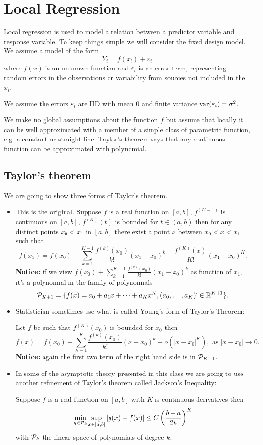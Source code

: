 
\chapter{Local Regression}
Local regression is used to model a relation between a predictor
variable and response variable. To keep things simple we will consider
the fixed design model. We assume a model of the form
\[
Y_i = f(x_i) + \varepsilon_i
\]
where $f(x)$ is an unknown function and $\varepsilon_i$ is an error term,
representing random errors in the observations or variability from
sources not included in the $x_i$.

We assume the errors $\varepsilon_i$ are IID with mean 0 and finite
variance $\mbox{var}(\varepsilon_i) = \sigma^2$. 

We make no global assumptions about the function $f$ but assume that
locally it can be well approximated with a member of a simple class of
parametric function, e.g. a constant or straight line. Taylor's
theorem says that any continuous function can be approximated with
polynomial. 
 
\section{Taylor's theorem}
We are going to show three forms of Taylor's theorem. 
\begin{itemize}

\item This is the original. Suppose $f$ is a real function on $[a,b]$, $f^{(K-1)}$ is continuous on
$[a,b]$,  $f^{(K)}(t)$ is bounded for $t \in (a,b)$ then
for any distinct points $x_0 < x_1$ in $[a,b]$ there exist a point
$x$ between $x_0 < x < x_1$ such that 
\[
f(x_1) = f(x_0) + \sum_{k=1}^{K-1} \frac{f^{(k)}(x_0)}{k!}(x_1-x_0)^k +
\frac{f^{(K)}(x)}{K!}(x_1 - x_0)^K.
\]
{\bf Notice:} if we view $f(x_0) + \sum_{k=1}^{K-1}
\frac{f^{(k)}(x_0)}{k!}(x_1-x_0)^k$ as function of $x_1$, it's a
polynomial in the family of polynomials  
\[
{\cal  P}_{K+1}= \{f(x) = a_0 + a_1 x + \dots + a_K x^K,
(a_0,\dots,a_K)' \in {\mathbb R}^{K+1}\}.
\]

\item Statistician sometimes use what is called Young's form of Taylor's
Theorem:

Let $f$ be such that $f^{(K)}(x_0)$ is bounded for $x_0$ then
\[
f(x) = f(x_0) +  \sum_{k=1}^{K} \frac{f^{(k)}(x_0)}{k!}(x-x_0)^k +
o(|x-x_0|^K), \mbox{ as } |x-x_0| \rightarrow 0.
\]
{\bf Notice:} again the first two term of the right hand side is in ${\cal P}_{K+1}$.


\item In some of the asymptotic theory presented in this class we are
  going to use another refinement of Taylor's theorem called Jackson's
  Inequality: 

  Suppose $f$ is a real function on $[a,b]$ with $K$ is continuous
  derivatives then
  \[
  \min_{g \in {\cal P}_k} \sup_{x \in [a,b]} |g(x) - f(x)| \leq C \left(
    \frac{b-a}{2k}\right)^K 
  \]
  with ${\cal P}_k$ the linear space of polynomials of degree $k$.
\end{itemize}

